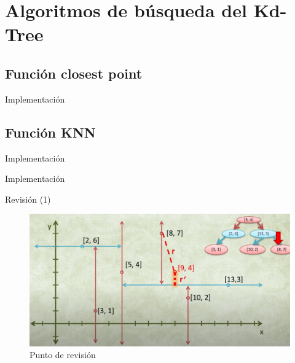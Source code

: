 \documentclass[11pt]{beamer}
\begin{document}
		
		
	\section{Algoritmos de búsqueda del Kd-Tree}
	    \subsection{Función closest point}
		\begin{frame}{Implementación}
			\justifying
			
			
			
		\end{frame}
		
		\subsection{ Función KNN}
		\begin{frame}{Implementación}
		
			\justifying
			
	
			
		\end{frame}
		
		\begin{frame}{Implementación}
			\justifying
		
			
			
		\end{frame}
		
		\begin{frame}{Revisión (1)}
			\justifying
			\begin{figure}[H]
				\centering
				\includegraphics[scale=0.25]{img/knn6.PNG}
				\caption{Punto de revisión}
				\label{fig:knn1}
			\end{figure}
		\end{frame}
		
\end{document}
